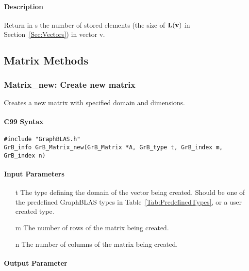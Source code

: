 \paragraph{Description}

Return in {\sf s} the number of stored elements (the size of $\bold{L}({\bf v})$
in Section~\ref{Sec:Vectors}) in vector {\sf v}.


\subsection{Matrix Methods}


\subsubsection{{\sf Matrix\_new}: Create new matrix}

Creates a new matrix with specified domain and dimensions.

\paragraph{C99 Syntax}

\begin{verbatim}
#include "GraphBLAS.h"
GrB_info GrB_Matrix_new(GrB_Matrix *A, GrB_type t, GrB_index m, GrB_index n)
\end{verbatim}

\paragraph{Input Parameters}

\begin{itemize}
	\item[{\sf t}] The type defining the domain of the vector being created. Should be one of the predefined
	GraphBLAS types in Table~\ref{Tab:PredefinedTypes}, or a user created type.
	\item[{\sf m}] The number of rows of the matrix being created.
	\item[{\sf n}] The number of columns of the matrix being created.
\end{itemize}

\paragraph{Output Parameter}

